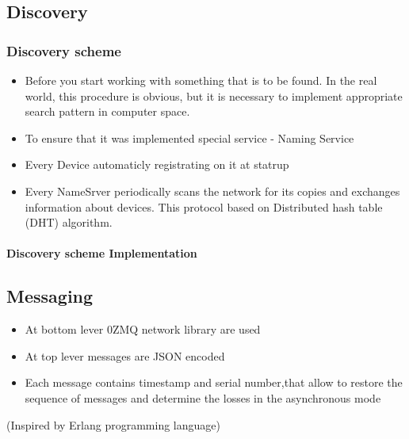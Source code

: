 \documentclass{beamer}
\begin{document}
\subsection{Discovery}
\begin{frame}
\frametitle{Discovery scheme}
\begin{itemize}
\item Before you start working with something that is to be found.
In the real world, this procedure is obvious, but it is
necessary to implement appropriate search pattern in computer space. 
\item To ensure that it was implemented special service - Naming Service
\item Every Device automaticly registrating on it at statrup
\item Every NameSrver periodically scans the network for its copies and
exchanges information about devices. This protocol based on Distributed hash
table (DHT) algorithm.
\end{itemize}
\end{frame}

\begin{frame}
\framesubtitle{Discovery scheme Implementation}
\end{frame}

\subsection{Messaging}
\begin{frame}
\begin{itemize}
  \item At bottom lever 0ZMQ network library are used 
  \item At top lever messages are JSON encoded
  \item Each message contains timestamp and serial number,that allow to
  restore the sequence of messages and determine the losses in the asynchronous mode
\end{itemize}

(Inspired by Erlang programming language)

\end{frame}
\end{document}
